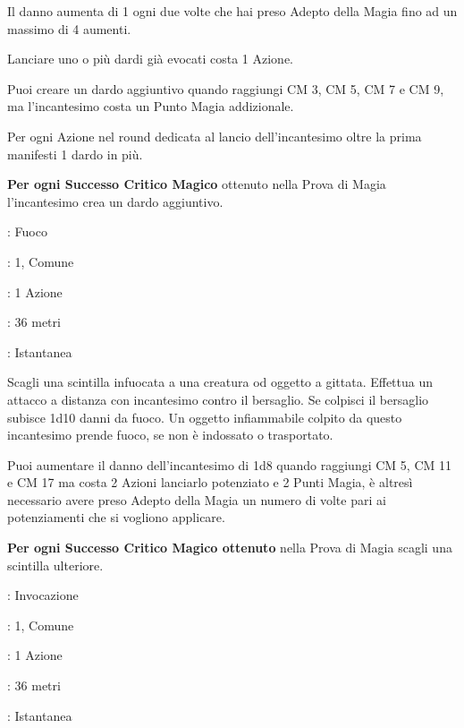\begin{multicols}{2}
Il danno aumenta di 1 ogni due volte che hai preso Adepto della Magia fino ad un massimo di 4 aumenti.

Lanciare uno o più dardi già evocati costa 1 Azione.

Puoi creare un dardo aggiuntivo quando raggiungi CM 3, CM 5, CM 7 e CM 9, ma l'incantesimo costa un Punto Magia addizionale.

Per ogni Azione nel round dedicata al lancio dell'incantesimo oltre la prima manifesti 1 dardo in più.

\textbf{Per ogni Successo Critico Magico} ottenuto nella Prova di Magia l'incantesimo crea un dardo aggiuntivo.

\noindent\colorbox{OBSSgold!10}{
\begin{minipage}{0.95\linewidth}
\begin{description}[noitemsep, topsep=0pt, parsep=0pt, partopsep=0pt, leftmargin=0cm, labelwidth=1.3cm]
	\item[\textbf{Lista}]: Fuoco
	\item[\textbf{Livello}]: 1, Comune
	\item[\textbf{Lancio}]: 1 Azione
	\item[\textbf{Gittata}]: 36 metri
	\item[\textbf{Durata}]: Istantanea
\end{description}
\end{minipage}}\smallskip

Scagli una scintilla infuocata a una creatura od oggetto a gittata. Effettua un attacco a distanza con incantesimo contro il bersaglio. Se colpisci il bersaglio subisce 1d10 danni da fuoco. Un oggetto infiammabile colpito da questo incantesimo prende fuoco, se non è indossato o trasportato.

Puoi aumentare il danno dell'incantesimo di 1d8 quando raggiungi CM 5, CM 11 e CM 17 ma costa 2 Azioni lanciarlo potenziato e 2 Punti Magia, è altresì necessario avere preso Adepto della Magia un numero di volte pari ai potenziamenti che si vogliono applicare.

\textbf{Per ogni Successo Critico Magico ottenuto} nella Prova di Magia scagli una scintilla ulteriore.

\noindent\colorbox{OBSSgold!10}{
\begin{minipage}{0.95\linewidth}
\begin{description}[noitemsep, topsep=0pt, parsep=0pt, partopsep=0pt, leftmargin=0cm, labelwidth=1.3cm]
	\item[\textbf{Lista}]: Invocazione
	\item[\textbf{Livello}]: 1, Comune
	\item[\textbf{Lancio}]: 1 Azione
	\item[\textbf{Gittata}]: 36 metri
	\item[\textbf{Durata}]: Istantanea
\end{description}
\end{minipage}}\smallskip


\end{multicols}
